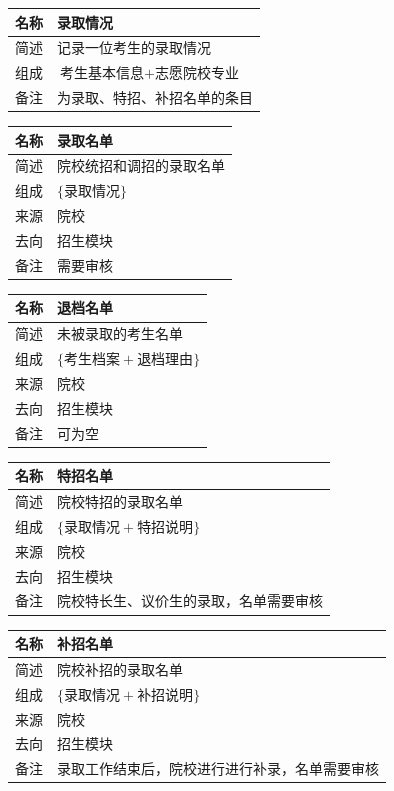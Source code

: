 \documentclass[CJK,utf8]{ctexrep}
\begin{document}
\begin{tabularx}{0.85\textwidth}{|l|X|}
	\hline
	\textbf{名称} & \textbf{录取情况} \\
	\hline
	简述 & 记录一位考生的录取情况 \\
	\hline
	组成 & $\text{考生基本信息}+\text{志愿院校专业}$ \\
	\hline
	备注 & 为录取、特招、补招名单的条目 \\
	\hline
\end{tabularx}

\begin{tabularx}{0.85\textwidth}{|l|X|}
	\hline
	\textbf{名称} & \textbf{录取名单} \\
	\hline
	简述 & 院校统招和调招的录取名单 \\
	\hline
	组成 & $\lbrace\text{录取情况}\rbrace$ \\
	\hline
	来源 & 院校 \\
	\hline
	去向 & 招生模块 \\
	\hline
	备注 & 需要审核 \\
	\hline
\end{tabularx}

\begin{tabularx}{0.85\textwidth}{|l|X|}
	\hline
	\textbf{名称} & \textbf{退档名单} \\
	\hline
	简述 & 未被录取的考生名单 \\
	\hline
	组成 & $\lbrace\text{考生档案}+\text{退档理由}\rbrace$ \\
	\hline
	来源 & 院校 \\
	\hline
	去向 & 招生模块 \\
	\hline
	备注 & 可为空 \\
	\hline
\end{tabularx}

\begin{tabularx}{0.85\textwidth}{|l|X|}
	\hline
	\textbf{名称} & \textbf{特招名单} \\
	\hline
	简述 & 院校特招的录取名单 \\
	\hline
	组成 & $\lbrace\text{录取情况}+\text{特招说明}\rbrace$ \\
	\hline
	来源 & 院校 \\
	\hline
	去向 & 招生模块 \\
	\hline
	备注 & 院校特长生、议价生的录取，名单需要审核 \\
	\hline
\end{tabularx}

\begin{tabularx}{0.85\textwidth}{|l|X|}
	\hline
	\textbf{名称} & \textbf{补招名单} \\
	\hline
	简述 & 院校补招的录取名单 \\
	\hline
	组成 & $\lbrace\text{录取情况}+\text{补招说明}\rbrace$ \\
	\hline
	来源 & 院校 \\
	\hline
	去向 & 招生模块 \\
	\hline
	备注 & 录取工作结束后，院校进行进行补录，名单需要审核 \\
	\hline
\end{tabularx}
\end{document}
